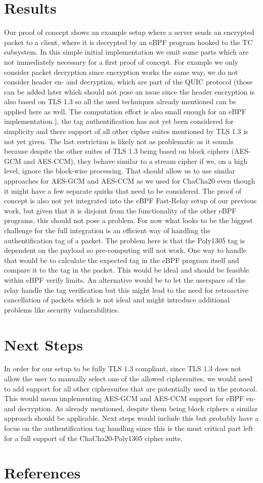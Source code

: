 \documentclass[a4paper,12pt]{article}
\begin{document}
\section{Results}
Our proof of concept shows an example setup where a server sends an encrypted packet to a client, where it is decrypted by an eBPF program 
hooked to the TC subsystem.
In this simple initial implementation we omit some parts which are not immediately necessary for a first proof of concept.
For example we only consider packet decryption since encryption works the same way, we do not consider header en- and decryption, 
which are part of the QUIC protocol (those can be added later which should not pose an issue since the header encryption 
is also based on TLS 1.3 so all the used techniques already mentioned can be applied here as well. The computation effort is also small enough 
for an eBPF implementation.), the tag authentification has not yet been considered for simplicity and there support of all other cipher suites 
mentioned by TLS 1.3 is not yet given.
The last restriction is likely not as problematic as it sounds because despite the other suites of TLS 1.3 being based on block ciphers (AES-GCM and AES-CCM),
they behave similar to a stream cipher if we, on a high level, ignore the block-wise processing.
That should allow us to use similar approaches for AES-GCM and AES-CCM as we used for ChaCha20 even though it might have a few separate quirks
that need to be considered.
The proof of concept is also not yet integrated into the eBPF Fast-Relay setup of our previous work, but given that it is disjoint from the 
functionality of the other eBPF programs, this should not pose a problem.
For now what looks to be the biggest challenge for the full integration is an efficient way of handling the authentification tag of a packet.
The problem here is that the Poly1305 tag is dependent on the payload so pre-computing will not work.
One way to handle that would be to calculate the expected tag in the eBPF program itself and compare it to the tag in the packet.
This would be ideal and should be feasible within eBPF verify limits.
An alternative would be to let the userspace of the relay handle the tag verification but this might lead to the need for retroactive cancellation of packets
which is not ideal and might introduce additional problems like security vulnerabilities.

\section{Next Steps}
In order for our setup to be fully TLS 1.3 compliant, since TLS 1.3 does not allow the user to manually select one of the allowed ciphersuites, 
we would need to add support for all other ciphersuites that are potentially used in the protocol.
This would mean implementing AES-GCM and AES-CCM support for eBPF en- and decryption. 
As already mentioned, despite them being block ciphers a similar approach should be applicable.
Next steps would include this but probably have a focus on the authentification tag handling since this is the most critical part left for a full
support of the ChaCha20-Poly1305 cipher suite.

\section{References}
\printbibliography{}
\end{document}

